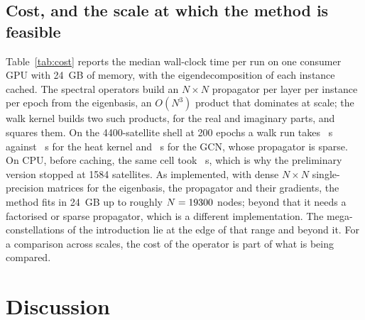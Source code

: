 \documentclass[preprint,11pt,3p]{elsarticle}
\begin{document}
\subsection{Cost, and the scale at which the method is feasible}
\label{sec:cost}

Table~\ref{tab:cost} reports the median wall-clock time per run on one consumer GPU with 24~GB
of memory, with the eigendecomposition of each instance cached. The spectral operators build an
$N\times N$ propagator per layer per instance per epoch from the eigenbasis, an $O(N^{3})$ product
that dominates at scale; the walk kernel builds two such products, for the real and imaginary
parts, and squares them. On the 4400-satellite shell at 200 epochs a walk run takes
\numSecsWalkLarge{}~s against \numSecsHeatLarge{}~s for the heat kernel and \numSecsGcnLarge{}~s
for the GCN, whose propagator is sparse. On CPU, before caching, the same cell took
\numCpuSecsLarge{}~s, which is why the preliminary version stopped at 1584 satellites. As
implemented, with dense $N\times N$ single-precision matrices for the eigenbasis, the propagator
and their gradients, the method fits in 24~GB up to roughly $N=19300{}$ nodes;
beyond that it needs a factorised or sparse propagator, which is a different implementation. The
mega-constellations of the introduction lie at the edge of that range and beyond it. For a
comparison across scales, the cost of the operator is part of what is being compared.

\begin{table}[htbp]
\centering
\caption{Median wall-clock seconds per training run on one GPU (eigendecomposition cached),
submitted capacity, by shell and operator, at the two budgets. The 4400-satellite shell was not
run at 1000 epochs.}
\label{tab:cost}

\end{table}

\section{Discussion}
\label{sec:discussion}
\end{document}
